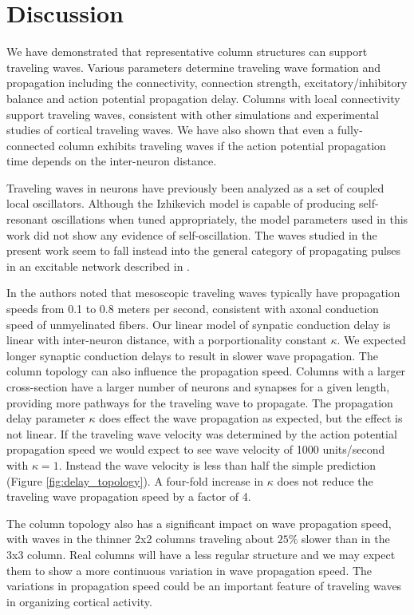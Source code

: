 \documentclass[a4paper,11pt]{article}
\begin{document}
\section{Discussion}
We have demonstrated that representative column structures can support traveling waves.
Various parameters determine traveling wave formation and propagation including the connectivity, connection strength, excitatory/inhibitory balance and action potential propagation delay.
Columns with local connectivity support traveling waves, consistent with other simulations and experimental studies of cortical traveling waves.
We have also shown that even a fully-connected column exhibits traveling waves if the action potential propagation time depends on the inter-neuron distance. 

Traveling waves in neurons have previously been analyzed as a set of coupled local oscillators.
Although the Izhikevich model is capable of producing self-resonant oscillations when tuned appropriately, the model parameters used in this work did not show any evidence of self-oscillation.
The waves studied in the present work seem to fall instead into the general category of propagating pulses in an excitable network described in \cite{ermentrout2001}. 

In \cite{muller2018} the authors noted that mesoscopic traveling waves typically have propagation speeds from 0.1 to 0.8 meters per second, consistent with axonal conduction speed of unmyelinated fibers.
Our linear model of synpatic conduction delay is linear with inter-neuron distance, with a porportionality constant $\kappa$.
We expected longer synaptic conduction delays to result in slower wave propagation.
The column topology can also influence the propagation speed.
Columns with a larger cross-section have a larger number of neurons and synapses for a given length, providing more pathways for the traveling wave to propagate.
The propagation delay parameter $\kappa$ does effect the wave propagation as expected, but the effect is not linear.
If the traveling wave velocity was determined by the action potential propagation speed we would expect to see wave velocity of 1000 units/second with $\kappa=1$.
Instead the wave velocity is less than half the simple prediction (Figure \ref{fig:delay_topology}).
A four-fold increase in $\kappa$ does not reduce the traveling wave propagation speed by a factor of 4. 

The column topology also has a significant impact on wave propagation speed, with waves in the thinner 2x2 columns traveling about $25\%$ slower than in the 3x3 column.
Real columns will have a less regular structure and we may expect them to show a more continuous variation in wave propagation speed. 
The variations in propagation speed could be an important feature of traveling waves in organizing cortical activity.

\clearpage
\printbibliography
\end{document}
